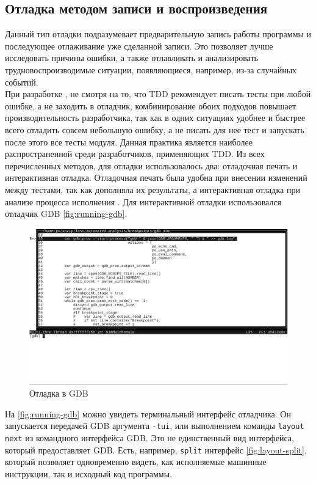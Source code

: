 \subsection{Отладка методом записи и воспроизведения}\label{sec:ch2/sec1/sub3/sub5}
Данный тип отладки подразумевает предварительную запись работы
программы и последующее отлаживание уже сделанной записи.
Это позволяет лучше исследовать причины ошибки, а также отлавливать и анализировать
трудновоспроизводимые ситуации, появляющиеся, например, из-за случайных событий.
\\

При разработке {\ProgModule}, не смотря на то, что TDD рекомендует писать тесты
при любой ошибке, а не заходить в отладчик, комбинирование обоих подходов
повышает производительность разработчика, так как в одних ситуациях
удобнее и быстрее всего отладить совсем небольшую ошибку, а не писать для нее тест
и запускать после этого все тесты модуля. Данная практика является
наиболее распространенной среди разработчиков, применяющих TDD.
Из всех перечисленных методов, для отладки {\ProgModule} использовалось два: отладочная
печать и интерактивная отладка. Отладочная печать была удобна при внесении изменений
между тестами, так как дополняла их результаты, а интерактивная отладка при анализе
процесса исполнения {\ProgModule}. Для интерактивной отладки использовался отладчик 
GDB \autoref{fig:running-gdb}.

\begin{figure}[!hbtp]
    \includegraphics[width=\textwidth,height=\textheight,keepaspectratio]{images/running-gdb.png}
    \caption{Отладка {\ProgModule} в GDB\label{fig:running-gdb}}
\end{figure}

На \autoref{fig:running-gdb} можно увидеть терминальный интерфейс отладчика. Он
запускается передачей GDB аргумента \verb|-tui|, или выполнением команды 
\verb|layout next| из командного интерфейса GDB.
Это не единственный вид интерфейса, который предоставляет GDB.
Есть, например, \verb|split| интерфейс \autoref{fig:layout-split},
который позволяет одновременно видеть, как исполняемые машинные инструкции,
так и исходный код программы.

